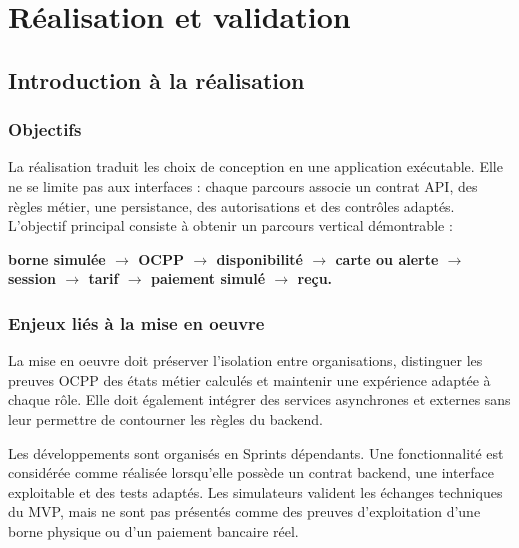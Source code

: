 \chapter{Réalisation et validation}
\label{chap:implementation}

\section{Introduction à la réalisation}

\subsection{Objectifs}

La réalisation traduit les choix de conception en une application exécutable.
Elle ne se limite pas aux interfaces : chaque parcours associe un contrat API,
des règles métier, une persistance, des autorisations et des contrôles adaptés.
L'objectif principal consiste à obtenir un parcours vertical démontrable :

\begin{center}
\textbf{borne simulée $\rightarrow$ OCPP $\rightarrow$ disponibilité
$\rightarrow$ carte ou alerte $\rightarrow$ session $\rightarrow$ tarif
$\rightarrow$ paiement simulé $\rightarrow$ reçu.}
\end{center}

\subsection{Enjeux liés à la mise en oeuvre}

La mise en oeuvre doit préserver l'isolation entre organisations, distinguer les
preuves OCPP des états métier calculés et maintenir une expérience adaptée à
chaque rôle. Elle doit également intégrer des services asynchrones et externes
sans leur permettre de contourner les règles du backend.

Les développements sont organisés en Sprints dépendants. Une fonctionnalité est
considérée comme réalisée lorsqu'elle possède un contrat backend, une interface
exploitable et des tests adaptés. Les simulateurs valident les échanges
techniques du MVP, mais ne sont pas présentés comme des preuves d'exploitation
d'une borne physique ou d'un paiement bancaire réel.







